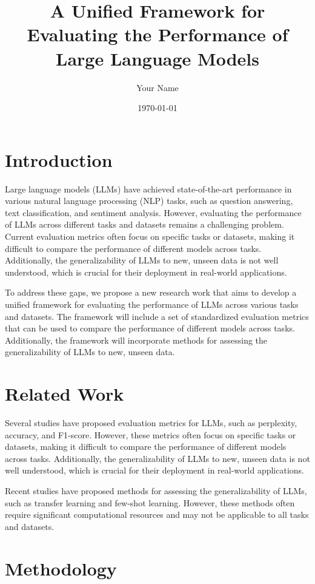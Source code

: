 \documentclass{article}
\title{A Unified Framework for Evaluating the Performance of Large Language Models}
\author{Your Name}
\date{\today}
\begin{document}
\maketitle

\section{Introduction}

Large language models (LLMs) have achieved state-of-the-art performance in various natural language processing (NLP) tasks, such as question answering, text classification, and sentiment analysis. However, evaluating the performance of LLMs across different tasks and datasets remains a challenging problem. Current evaluation metrics often focus on specific tasks or datasets, making it difficult to compare the performance of different models across tasks. Additionally, the generalizability of LLMs to new, unseen data is not well understood, which is crucial for their deployment in real-world applications.

To address these gaps, we propose a new research work that aims to develop a unified framework for evaluating the performance of LLMs across various tasks and datasets. The framework will include a set of standardized evaluation metrics that can be used to compare the performance of different models across tasks. Additionally, the framework will incorporate methods for assessing the generalizability of LLMs to new, unseen data.

\section{Related Work}

Several studies have proposed evaluation metrics for LLMs, such as perplexity, accuracy, and F1-score. However, these metrics often focus on specific tasks or datasets, making it difficult to compare the performance of different models across tasks. Additionally, the generalizability of LLMs to new, unseen data is not well understood, which is crucial for their deployment in real-world applications.

Recent studies have proposed methods for assessing the generalizability of LLMs, such as transfer learning and few-shot learning. However, these methods often require significant computational resources and may not be applicable to all tasks and datasets.

\section{Methodology}
\end{document}
